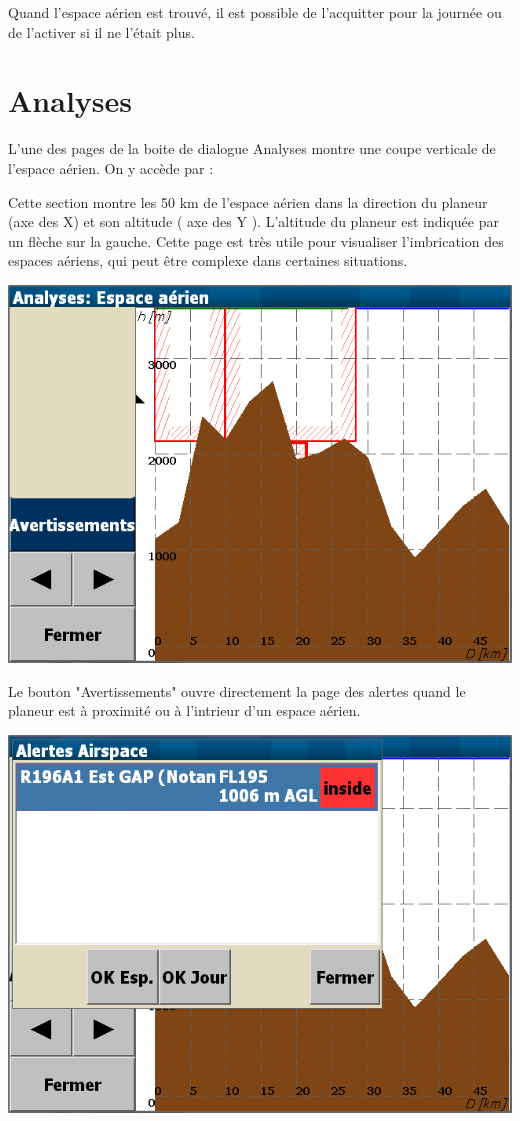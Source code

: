 Quand l'espace aérien est trouvé, il est possible de l'acquitter pour la journée ou de l'activer si il ne l'était plus.

\section{Analyses}

L'une des pages de la boite de dialogue Analyses montre une coupe verticale de l'espace aérien. On y accède par :
\begin{quote}
\blink{}
\end{quote}

Cette section montre les 50 km de l'espace aérien dans la direction du planeur (axe des X) et son altitude ( axe des Y ). L'altitude du planeur est indiquée par un flèche sur la gauche. Cette page est très utile pour visualiser l'imbrication des espaces aériens, qui peut être complexe dans certaines situations.

\begin{center}
\includegraphics[angle=0,width=0.8\linewidth,keepaspectratio='true']{figures/analysis-airspace.png}
\end{center}

Le bouton "Avertissements" ouvre directement la page des alertes quand le planeur est à proximité ou à l'intrieur d'un espace aérien.
\begin{center}
\includegraphics[angle=0,width=0.8\linewidth,keepaspectratio='true']{figures/analysis-airspace2.png}
\end{center}


